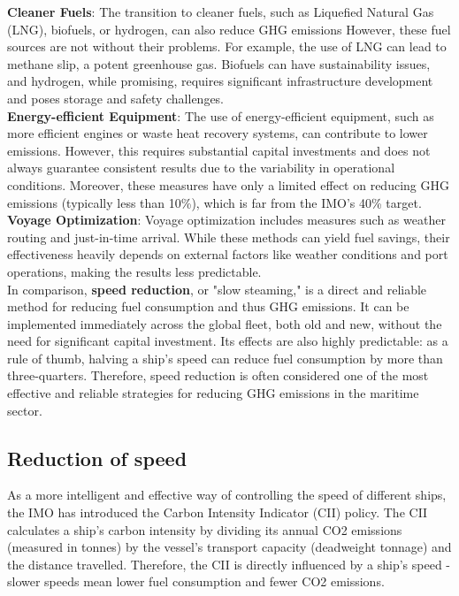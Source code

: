 \documentclass[a4paper,12pt]{article}
\begin{document}
\textbf{Cleaner Fuels}: The transition to cleaner fuels, such as Liquefied Natural Gas (LNG), biofuels, or hydrogen, can also reduce GHG emissions
However, these fuel sources are not without their problems. For example, the use of LNG can lead to methane slip, a potent greenhouse gas.
Biofuels can have sustainability issues, and hydrogen, while promising, requires significant infrastructure development and poses storage and safety challenges.\\

\textbf{Energy-efficient Equipment}: The use of energy-efficient equipment, such as more efficient engines or waste heat recovery systems, can contribute to lower emissions. However, this requires substantial capital investments and does not always guarantee consistent results due to the variability in operational conditions.
Moreover, these measures have only a limited effect on reducing GHG emissions (typically less than 10\%), which is far from the IMO's 40\% target.\\

\textbf{Voyage Optimization}: Voyage optimization includes measures such as weather routing and just-in-time arrival. While these methods can yield fuel savings, their effectiveness heavily depends on external factors like weather conditions and port operations, making the results less predictable.\\

In comparison, \textbf{speed reduction}, or "slow steaming," is a direct and reliable method for reducing fuel consumption and thus GHG emissions.
It can be implemented immediately across the global fleet, both old and new, without the need for significant capital investment.
Its effects are also highly predictable: as a rule of thumb, halving a ship's speed can reduce fuel consumption by more than three-quarters.
Therefore, speed reduction is often considered one of the most effective and reliable strategies for reducing GHG emissions in the maritime sector.\\

\subsection{Reduction of speed}
As a more intelligent and effective way of controlling the speed of different ships, the IMO has introduced the Carbon Intensity Indicator (CII) policy.
The CII calculates a ship's carbon intensity by dividing its annual CO2 emissions (measured in tonnes) by the vessel's transport capacity (deadweight tonnage) and the distance travelled. Therefore, the CII is directly influenced by a ship's speed - slower speeds mean lower fuel consumption and fewer CO2 emissions.\\
\end{document}
